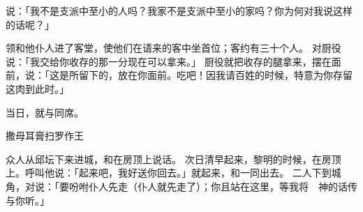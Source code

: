 {说：「我不是{}支派中至小的{}人吗？我家不是{}支派中至小的家吗？你为何对我说这样的话呢？」
\par }{\PP {}领{}和他仆人进了客堂，使他们在请来的客中坐首位；客约有三十个人。
对厨役说：「我交给你收存的那一分{}现在可以拿来。」
厨役就把收存的腿拿来，摆在{}面前，{}说：「这是所留下的，放在你面前。吃吧！因我请百姓的时候，特意为你存留这肉到此时。」
\par }{\PP 当日，{}就与{}同席。
\par }{\SH 撒母耳膏扫罗作王
\par }{\PP {}众人从邱坛下来进城，{}和{}在房顶上说话。
次日清早起来，黎明的时候，{}在房顶上。{}呼叫他说：「起来吧，我好送你回去。」{}就起来，和{}一同出去。
二人下到城角，{}对{}说：「要吩咐仆人先走（仆人就先走了）；你且站在这里，等我将　神的话传与你听。」

}
